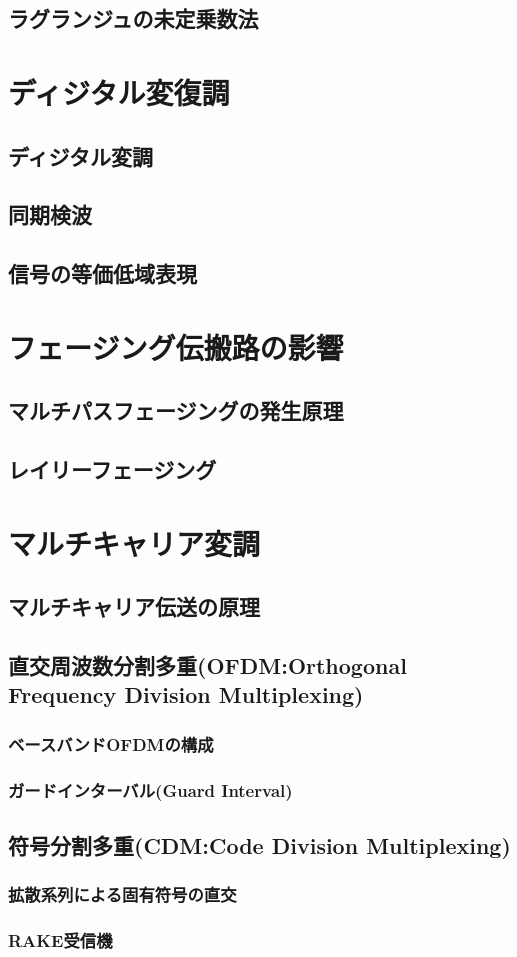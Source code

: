 \subsection{ラグランジュの未定乗数法}

\section{ディジタル変復調}
\subsection{ディジタル変調}
\subsection{同期検波}
\subsection{信号の等価低域表現}

\section{フェージング伝搬路の影響}
\subsection{マルチパスフェージングの発生原理}
\subsection{レイリーフェージング}

\section{マルチキャリア変調}
\subsection{マルチキャリア伝送の原理}
\subsection{直交周波数分割多重(OFDM:Orthogonal Frequency Division Multiplexing)}
\subsubsection{ベースバンドOFDMの構成}
\subsubsection{ガードインターバル(Guard Interval)}
\subsection{符号分割多重(CDM:Code Division Multiplexing)}
\subsubsection{拡散系列による固有符号の直交}
\subsubsection{RAKE受信機}